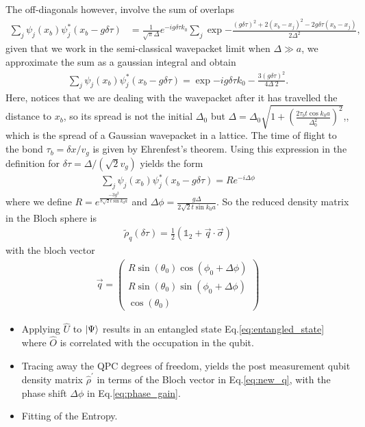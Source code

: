 \documentclass[10pt,
 amsmath,amssymb,
 aps,prb, twocolumn
]{revtex4-2}
\newcommand{\id}{\mathds{1}}
\begin{document}
The off-diagonals however, involve the sum of overlaps
\begin{align}
    \sum_j \psi_j(x_b)\psi^{*}_j(x_b-g\delta\tau)  & = \frac{1}{\sqrt{\pi}\Delta} e^{-i g \delta\tau k_0}\sum_{j} \exp{-\frac{(g\delta\tau)^2 + 2(x_b-x_j)^2 - 2 g\delta\tau (x_b-x_j)}{2\Delta^2}},
\end{align}
given that we work in the semi-classical wavepacket limit when \mbox{$\Delta \gg a $}, we approximate the sum as a gaussian integral and obtain 
\begin{align}
\sum_j \psi_j(x_b)\psi^{*}_j(x_b-g\delta\tau) = \exp{-i g\delta\tau k_0  - \frac{3(g\delta\tau)^2}{4 \Delta~2}}.
\end{align}
Here, notices that we are dealing with the wavepacket after it has travelled the distance to $x_b$, so its spread is not the initial \mbox{$\Delta_0$} but \mbox{$\Delta = \Delta_0\sqrt{1+\left(\frac{2\tau_b t \cos{k_0a}}{\Delta_0^2}\right)^2}$},, which is the spread of a Gaussian wavepacket in a lattice. The time of flight to the bond \mbox{$\tau_b  = \delta x/v_g$} is given by Ehrenfest's theorem. Using this expression in the definition for \mbox{$\delta\tau=\Delta/(\sqrt{2}v_g)$} yields the form
\begin{align}
    \sum_j \psi_j(x_b)\psi^{*}_j(x_b-g\delta\tau) = R e^{-i \Delta\phi}
\end{align}
where we define \mbox{$R= e^{\frac{- 3 g^2}{8\sqrt{2}t\sin k_0a}}$} and \mbox{$\Delta \phi = \frac{g\Delta}{2\sqrt{2} t \sin k_0a}$}. So the reduced density matrix in the Bloch sphere is 
\begin{align}
    \tilde{\rho}_q(\delta\tau) = \frac{1}{2}(\id_2+\vec{q}\cdot\vec{\sigma})
\end{align}
with the bloch vector
\begin{align}
    \vec{q} = \begin{pmatrix}
        R \sin(\theta_0) \cos{(\phi_0 +\Delta\phi)}\\
        R\sin(\theta_0) \sin{(\phi_0 +\Delta\phi)}\\
        \cos(\theta_0)
    \end{pmatrix}
\end{align}

\begin{itemize}

    \item Applying $\hat{U}$ to $\ket{\Psi}$ results in an entangled state Eq.\eqref{eq:entangled_state} where $\hat{O}$ is correlated with the occupation in the qubit. 
    
    \item Tracing away the QPC degrees of freedom, yields the post measurement qubit density matrix $\hat{\rho}^\prime$ in terms of the Bloch vector in Eq.\eqref{eq:new_q}, with the phase shift $\Delta \phi$ in Eq.\eqref{eq:phase_gain}.

    \item Fitting of the Entropy.
\end{itemize}
\end{document}
